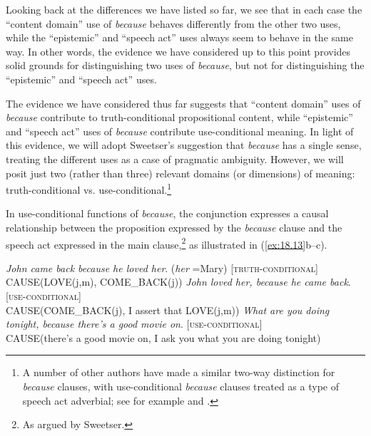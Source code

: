 \ea \label{ex:18.12}
\z \z


Looking back at the differences we have listed so far, we see that in each case the “content domain” use of \textit{because} behaves differently from the other two uses, while the “epistemic” and “speech act” uses always seem to behave in the same way. In other words, the evidence we have considered up to this point provides solid grounds for distinguishing two uses of \textit{because}, but not for distinguishing the “epistemic” and “speech act” uses.



The evidence we have considered thus far suggests that “content domain” uses of \textit{because} contribute to truth-conditional propositional content, while “epistemic” and “speech act” uses of \textit{because} contribute use-conditional meaning. In light of this evidence, we will adopt Sweetser’s suggestion that \textit{because} has a single sense, treating the different uses as a case of pragmatic ambiguity. However, we will posit just two (rather than three) relevant domains (or dimensions) of meaning: truth-conditional vs. use-conditional.\footnote{A number of other authors have made a similar two-way distinction for \textit{because} clauses, with use-conditional \textit{because} clauses treated as a type of speech act adverbial; see for example \citet{Scheffler2008,Scheffler2013} and \citet{ThompsonEtAl2007}.} 



In use-conditional functions of \textit{because}, the conjunction expresses a causal relationship between the proposition expressed by the \textit{because} clause and the speech act expressed in the main clause,\footnote{As argued by Sweetser.} as illustrated in (\ref{ex:18.13}b--c).


\ea \label{ex:18.13}
\ea  \textit{John came back because he loved her}. (\textit{her} =Mary)  [\textsc{truth-conditional}]\\
CAUSE(LOVE(j,m), COME\_BACK(j))
\ex   \textit{John loved her, because he came back}.   [\textsc{use-conditional}]\\
CAUSE(COME\_BACK(j), I assert that LOVE(j,m))
\ex   \textit{What are you doing tonight, because there’s a good movie on}.  [\textsc{use-conditional}]\\
CAUSE(there’s a good movie on, I ask you what you are doing tonight)
\z \z


